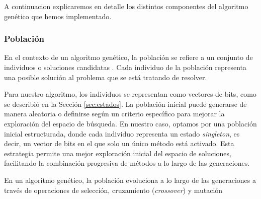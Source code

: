 





A continuacion explicaremos en detalle los distintos componentes del algoritmo genético que hemos implementado.

\subsubsection{Población}

En el contexto de un algoritmo genético, la población se refiere a un conjunto de individuos o soluciones candidatas \cite{Goldberg:1989}. 
Cada individuo de la población representa una posible solución al problema que se está tratando de resolver.

Para nuestro algoritmo, los individuos se representan como vectores de bits, como se describió en la Sección \ref{sec:estados}. 
La población inicial puede generarse de manera aleatoria o definirse según un criterio específico para mejorar la exploración del espacio de búsqueda. 
En nuestro caso, optamos por una población inicial estructurada, donde cada individuo representa un estado \emph{singleton}, es decir, 
un vector de bits en el que solo un único método está activado. Esta estrategia permite una mejor exploración inicial del espacio de soluciones, 
facilitando la combinación progresiva de métodos a lo largo de las generaciones.

En un algoritmo genético, la población evoluciona a lo largo de las generaciones a través de operaciones de selección, 
cruzamiento (\emph{crossover}) y mutación \cite{Goldberg:1989}

